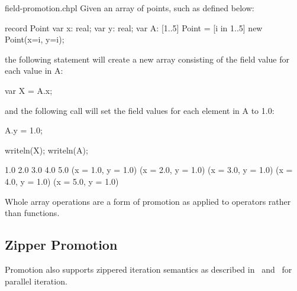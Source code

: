 \begin{chapelexample}{field-promotion.chpl}
Given an array of points, such as  defined below:
\begin{chapel}
record Point {
  var x: real;
  var y: real;
}
var A: [1..5] Point = [i in 1..5] new Point(x=i, y=i);
\end{chapel}
the following statement will create a new array consisting of
the  field value for each value in A:
\begin{chapel}
var X = A.x;
\end{chapel}
and the following call will set the  field values for each
element in A to 1.0:
\begin{chapel}
A.y = 1.0;
\end{chapel}

\begin{chapelnoprint}
writeln(X);
writeln(A);
\end{chapelnoprint}
\begin{chapeloutput}
1.0 2.0 3.0 4.0 5.0
(x = 1.0, y = 1.0) (x = 2.0, y = 1.0) (x = 3.0, y = 1.0) (x = 4.0, y = 1.0) (x = 5.0, y = 1.0)
\end{chapeloutput}
\end{chapelexample}



Whole array operations are a form of promotion as applied to operators
rather than functions.


\subsection{Zipper Promotion}
\label{Zipper_Promotion}

Promotion also supports zippered iteration semantics as described
in~ and~ for parallel
iteration.

